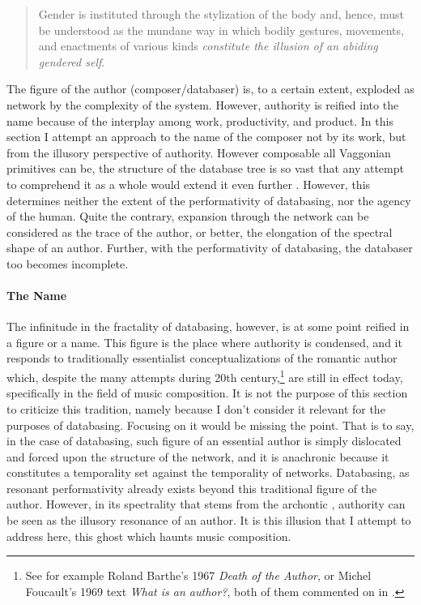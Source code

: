 \begin{quote}
	Gender is instituted through the stylization of the body and, hence, must be understood as the mundane way in which bodily gestures, movements, and enactments of various kinds \textit{constitute the illusion of an abiding gendered self}. \im \parencite[519]{But88:Per}
\end{quote}

The figure of the author (composer/databaser) is, to a certain extent, exploded as network by the complexity of the system. However, authority is reified into the name because of the interplay among work, productivity, and product. In this section I attempt an approach to the name of the composer not by its work, but from the illusory perspective of authority. However composable all Vaggonian primitives can be, the structure of the database tree is so vast that any attempt to comprehend it as a whole would extend it even further . However, this determines neither the extent of the performativity of databasing, nor the agency of the human. Quite the contrary, expansion through the network can be considered as the trace of the author, or better, the elongation of the spectral shape of an author. Further, with the performativity of databasing, the databaser too becomes incomplete.

\paragraph{The Name}
The infinitude in the fractality of databasing, however, is at some point reified in a figure or a name. This figure is the place where authority is condensed, and it responds to traditionally essentialist conceptualizations of the romantic author which, despite the many attempts during 20th century,\footnote{See for example Roland Barthe's 1967 \textit{Death of the Author}, or Michel Foucault's 1969 text \textit{What is an author?}, both of them commented on in \parencite{Dan07:The}.} are still in effect today, specifically in the field of music composition. It is not the purpose of this section to criticize this tradition, namely because I don't consider it relevant for the purposes of databasing. Focusing on it would be missing the point. That is to say, in the case of databasing, such figure of an essential author is simply dislocated and forced upon the structure of the network, and it is anachronic because it constitutes a temporality set against the temporality of networks. Databasing, as resonant performativity already exists beyond this traditional figure of the author. However, in its spectrality that stems from the archontic , authority can be seen as the illusory resonance of an author. It is this illusion that I attempt to address here, this ghost which haunts music composition.

